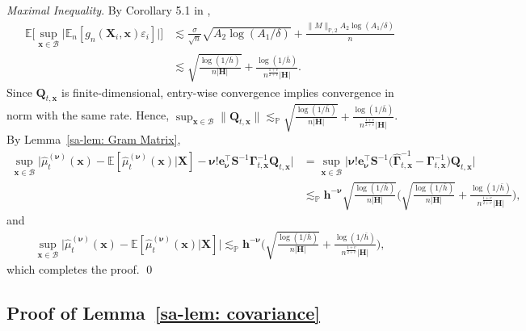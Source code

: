 \documentclass[10pt]{article}
\newcommand{\E}{\mathbb{E}}
\newcommand{\En}{\mathbb{E}_n}
\newcommand{\lessp}{\lesssim_{\mathbb{P}}}
\newcommand{\pnorm}[1]{\lVert #1 \rVert_{\mathbb{P},2}}
\newcommand{\be}{\mathbf{e}}
\newcommand{\bh}{\mathbf{h}}
\newcommand{\bH}{\mathbf{H}}
\newcommand{\bQ}{\mathbf{Q}}
\newcommand{\bS}{\mathbf{S}}
\newcommand{\bx}{\mathbf{x}}
\newcommand{\bX}{\mathbf{X}}
\newcommand{\bnu}{\boldsymbol{\nu}}
\newcommand{\bGamma}{\boldsymbol{\Gamma}}
\newcommand{\B}{\mathcal{B}}
\begin{document}
\medskip\textit{Maximal Inequality}. By Corollary 5.1 in \cite{Chernozhukov-Chetverikov-Kato_2014b_AoS},
\begin{align*}
    \E \Big[\sup_{\bx \in \B} \big|\En [g_n(\bX_i,\bx)\varepsilon_i] \big| \Big]
    & \lesssim \frac{\sigma}{\sqrt{n}}\sqrt{A_2\log(A_1/\delta)} + \frac{\pnorm{M} A_2\log(A_1/\delta)}{n}\\
    & \lesssim \sqrt{\frac{\log(1/\bar{h})}{n |\bH|}} +\frac{\log(1/\bar{h})}{n^{\frac{1+v}{2+v}} |\bH|}.
\end{align*}
Since $\bQ_{t,\bx}$ is finite-dimensional, entry-wise convergence implies convergence in norm with the same rate. Hence, $\sup_{\bx \in \B} \big\|\bQ_{t,\bx}\big\| \lessp \sqrt{\frac{\log(1/\bar{h})}{n |\bH|}} + \frac{\log(1/\bar{h})}{n^{\frac{1+v}{2+v}}|\bH|}$. By Lemma~\ref{sa-lem: Gram Matrix},
\begin{align*}
    \sup_{\bx \in \B} \big|\widehat{\mu}_t^{(\bnu)}(\bx) - \E [\widehat{\mu}_t^{(\bnu)}(\bx) | \bX ]
                           - \bnu!\be_{\bnu}^{\top} \bS^{-1} \bGamma_{t,\bx}^{-1} \bQ_{t,\bx} \big|
    &= \sup_{\bx \in \B} \big| \bnu!\be_{\bnu}^{\top} \bS^{-1} \big(\widehat{\bGamma}_{t,\bx}^{-1} - \bGamma_{t,\bx}^{-1} \big) \bQ_{t,\bx}\big| \\
    & \lessp \bh^{-\bnu} \sqrt{\frac{\log(1/\bar{h})}{n |\bH|}} \Big(\sqrt{\frac{\log(1/\bar{h})}{n |\bH|}} + \frac{\log(1/\bar{h})}{n^{\frac{1+v}{2+v}}|\bH|} \Big),
\end{align*}
and
\begin{align*}
    \sup_{\bx \in \B} \big|\widehat{\mu}_t^{(\bnu)}(\bx) - \E[\widehat{\mu}_t^{(\bnu)}(\bx) | \bX ] \big|
    \lessp \bh^{-\bnu} \Big(\sqrt{\frac{\log(1/\bar{h})}{n |\bH|}} + \frac{\log(1/\bar{h})}{n^{\frac{1+v}{2+v}}|\bH|}\Big),
\end{align*}
which completes the proof.
\qed


\subsection{Proof of Lemma~\ref{sa-lem: covariance}}
\end{document}
